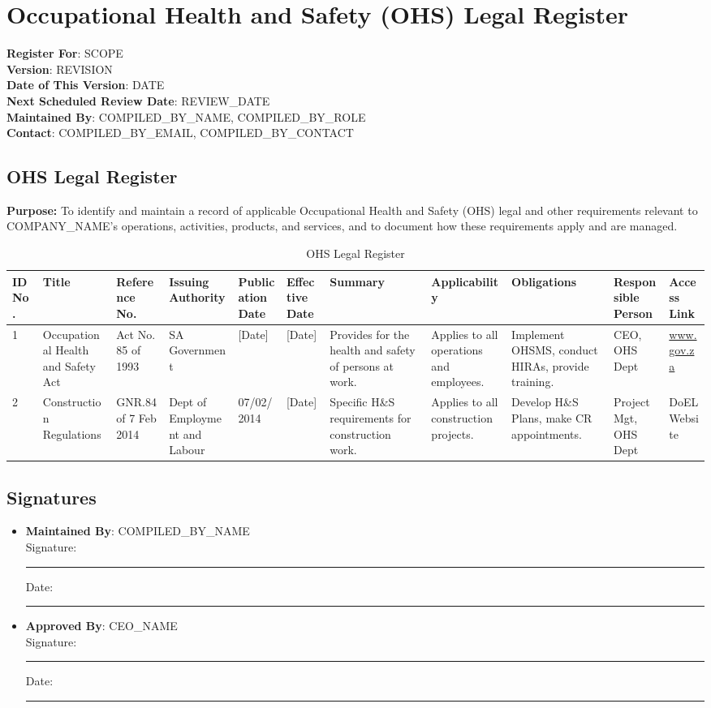 \documentclass[11pt]{article}
\newcommand{\userCompany}{{{COMPANY_NAME}}}
\newcommand{\docTitle}{Occupational Health and Safety (OHS) Legal Register}
\newcommand{\issueDate}{{{DATE}}}
\newcommand{\scope}{{{SCOPE}}}
\newcommand{\reviewDate}{{{REVIEW_DATE}}}
\newcommand{\compilerName}{{{COMPILED_BY_NAME}}}
\newcommand{\compilerRole}{{{COMPILED_BY_ROLE}}}
\newcommand{\compilerEmail}{{{COMPILED_BY_EMAIL}}}
\newcommand{\compilerPhone}{{{COMPILED_BY_CONTACT}}}
\newcommand{\revision}{{{REVISION}}}
\begin{document}
\section*{\docTitle}
\textbf{Register For}: \scope \\
\textbf{Version}: \revision \\
\textbf{Date of This Version}: \issueDate \\
\textbf{Next Scheduled Review Date}: \reviewDate \\
\textbf{Maintained By}: \compilerName, \compilerRole \\
\textbf{Contact}: \compilerEmail, \compilerPhone

\subsection*{OHS Legal Register}
\textbf{Purpose:} To identify and maintain a record of applicable Occupational Health and Safety (OHS) legal and other requirements relevant to \userCompany's operations, activities, products, and services, and to document how these requirements apply and are managed.

\begin{table}[h]
    \centering
    \begin{tabular}{p{1cm}p{3cm}p{2cm}p{2cm}p{2cm}p{2cm}p{3cm}p{3cm}p{2cm}p{2cm}p{2cm}}
        \toprule
        \textbf{ID No.} & \textbf{Title} & \textbf{Reference No.} & \textbf{Issuing Authority} & \textbf{Publication Date} & \textbf{Effective Date} & \textbf{Summary} & \textbf{Applicability} & \textbf{Obligations} & \textbf{Responsible Person} & \textbf{Access Link} \\
        \midrule
        1 & Occupational Health and Safety Act & Act No. 85 of 1993 & SA Government & [Date] & [Date] & Provides for the health and safety of persons at work. & Applies to all operations and employees. & Implement OHSMS, conduct HIRAs, provide training. & CEO, OHS Dept & \href{www.gov.za}{www.gov.za} \\
        2 & Construction Regulations & GNR.84 of 7 Feb 2014 & Dept of Employment and Labour & 07/02/2014 & [Date] & Specific H\&S requirements for construction work. & Applies to all construction projects. & Develop H\&S Plans, make CR appointments. & Project Mgt, OHS Dept & DoEL Website \\
        \bottomrule
    \end{tabular}
    \caption{OHS Legal Register}
\end{table}

\subsection*{Signatures}
\begin{itemize}
  \item \textbf{Maintained By}: \compilerName \\
    Signature: \rule{5cm}{0.4pt} \quad Date: \rule{3cm}{0.4pt}
  \item \textbf{Approved By}: {{CEO_NAME}} \\
    Signature: \rule{5cm}{0.4pt} \quad Date: \rule{3cm}{0.4pt}
\end{itemize}
\end{document}
